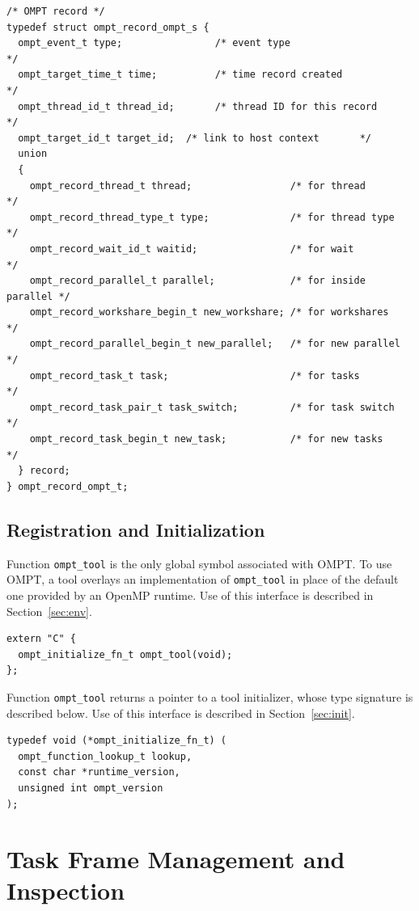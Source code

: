 \documentclass{article}
\begin{document}
\begin{verbatim}
/* OMPT record */
typedef struct ompt_record_ompt_s {
  ompt_event_t type;                /* event type                       */
  ompt_target_time_t time;          /* time record created              */
  ompt_thread_id_t thread_id;       /* thread ID for this record        */
  ompt_target_id_t target_id;  /* link to host context       */
  union
  {
    ompt_record_thread_t thread;                 /* for thread          */
    ompt_record_thread_type_t type;              /* for thread type     */
    ompt_record_wait_id_t waitid;                /* for wait            */
    ompt_record_parallel_t parallel;             /* for inside parallel */
    ompt_record_workshare_begin_t new_workshare; /* for workshares      */
    ompt_record_parallel_begin_t new_parallel;   /* for new parallel    */
    ompt_record_task_t task;                     /* for tasks           */
    ompt_record_task_pair_t task_switch;         /* for task switch     */
    ompt_record_task_begin_t new_task;           /* for new tasks       */
  } record;
} ompt_record_ompt_t;
\end{verbatim}

\clearpage
\subsection{Registration and Initialization} 
\label{sec:app:init}

\noindent
Function \verb|ompt_tool| is the only global symbol associated with OMPT. To use OMPT, a tool overlays an implementation of \verb|ompt_tool| in place of the default one provided by an OpenMP runtime. Use of this interface is described in Section~\ref{sec:env}.
\begin{verbatim}
extern "C" {
  ompt_initialize_fn_t ompt_tool(void);
};
\end{verbatim}
Function \verb|ompt_tool| returns a pointer to a tool initializer, whose type signature is described below. Use of this interface is described in Section~\ref{sec:init}.

\begin{verbatim}
typedef void (*ompt_initialize_fn_t) (
  ompt_function_lookup_t lookup,
  const char *runtime_version, 
  unsigned int ompt_version
);
\end{verbatim}



\clearpage
\section{Task Frame Management and Inspection}
\label{app:frame}
\end{document}
